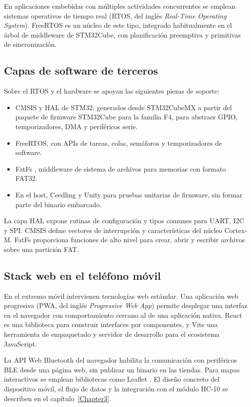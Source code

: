 En aplicaciones embebidas con múltiples actividades concurrentes se emplean sistemas operativos de tiempo real (RTOS, del inglés \textit{Real-Time Operating System}). FreeRTOS \citep{freertos} es un núcleo de este tipo, integrado habitualmente en el árbol de middleware de STM32Cube, con planificación preemptiva y primitivas de sincronización.

\subsection{Capas de software de terceros}

Sobre el RTOS y el hardware se apoyan las siguientes piezas de soporte:

\begin{itemize}
	\item CMSIS y HAL de STM32, generados desde STM32CubeMX a partir del paquete de firmware STM32Cube para la familia F4, para abstraer GPIO, temporizadores, DMA y periféricos serie.
	\item FreeRTOS, con APIs de tareas, colas, semáforos y temporizadores de software.
	\item FatFs \citep{chan_fatfs}, middleware de sistema de archivos para memorias con formato FAT32.
	\item En el host, Ceedling \citep{ceedling} y Unity \citep{unity} para pruebas unitarias de firmware, sin formar parte del binario embarcado.
\end{itemize}

La capa HAL expone rutinas de configuración y tipos comunes para UART, I2C y SPI. CMSIS define vectores de interrupción y características del núcleo Cortex-M. FatFs proporciona funciones de alto nivel para crear, abrir y escribir archivos sobre una partición FAT.

\subsection{Stack web en el teléfono móvil}

En el extremo móvil intervienen tecnologías web estándar. Una aplicación web progresiva (PWA, del inglés \textit{Progressive Web App}) \citep{mdn_pwa} permite desplegar una interfaz en el navegador con comportamiento cercano al de una aplicación nativa. React \citep{react} es una biblioteca para construir interfaces por componentes, y Vite \citep{vite} una herramienta de empaquetado y servidor de desarrollo para el ecosistema JavaScript.

La API Web Bluetooth \citep{w3c_web_bluetooth} del navegador habilita la comunicación con periféricos BLE desde una página web, sin publicar un binario en las tiendas. Para mapas interactivos se emplean bibliotecas como Leaflet \citep{leaflet}. El diseño concreto del dispositivo móvil, el flujo de datos y la integración con el módulo HC-10 se describen en el capítulo~\ref{Chapter3}.

